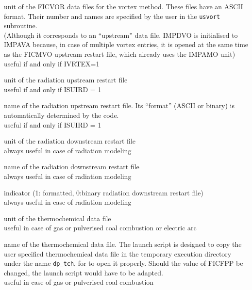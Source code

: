 {unit of the FICVOR data files for the vortex method. These files have an ASCII
format. Their number and names are specified by the user in the \texttt{usvort} subroutine.\\
(Although it corresponds to an ``upstream'' data file, IMPDVO is initialised to
IMPAVA because, in case of multiple vortex entries, it is opened at the same time
as the FICMVO upstream restart file, which already uses the IMPAMO unit)\\
useful if and only if IVRTEX=1}



{unit of the radiation upstream restart file\\
useful if and only if ISUIRD = 1}

{name of the radiation upstream restart file. Its ``format'' (ASCII or
binary) is automatically determined by the code.\\
useful if and only if ISUIRD = 1}

{unit of the radiation downstream restart file\\
always useful in case of radiation modeling}

{name of the radiation downstream restart file \\
always useful in case of radiation modeling}

{indicator (1: formatted, 0:binary radiation downstream restart file)\\
always useful in case of radiation modeling}




{unit of the thermochemical data file\\
useful in case of gas or pulverised coal combustion or electric arc}

{name of the thermochemical data file. The launch script is designed to copy the
user specified thermochemical data file in the temporary execution directory
under the name \texttt{dp\_tch}, for \CS to open it properly. Should the value
of FICFPP be changed, the launch script would have to be adapted.\\
useful in case of gas or pulverised coal combustion}


